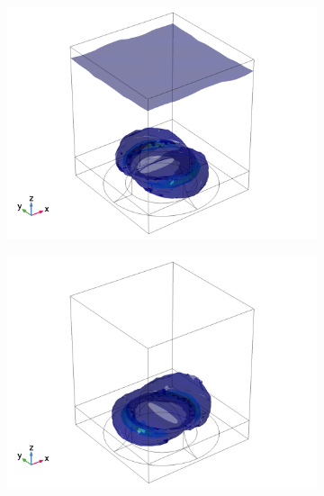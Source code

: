 \begin{figure}[h!]
    \begin{subfigure}{0.5\textwidth}
        \centering
        \includegraphics[width=\linewidth, trim=0.4cm 0 1.5cm 0, clip]{figures/ch4/S5A/FieldDistribution/isosurface/Sample5A_nomE_wl620_phi0_TE.png}
    \end{subfigure}
    \begin{subfigure}{0.5\textwidth}
        \centering
        \includegraphics[width=\linewidth, trim=0.6cm 0 1.6cm 0, clip]{figures/ch4/S5A/FieldDistribution/isosurface/Sample5A_nomE_wl620_phi0_TM.png}
    \end{subfigure}
    

\end{figure}
